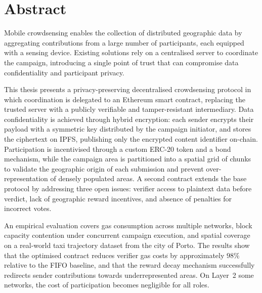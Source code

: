 \chapter*{Abstract}
Mobile crowdsensing enables the collection of distributed geographic data
by aggregating contributions from a large number of participants, each
equipped with a sensing device.
Existing solutions rely on a centralised server to coordinate the campaign,
introducing a single point of trust that can compromise data confidentiality
and participant privacy.

This thesis presents a privacy-preserving decentralised crowdsensing protocol
in which coordination is delegated to an Ethereum smart contract, replacing
the trusted server with a publicly verifiable and tamper-resistant intermediary.
Data confidentiality is achieved through hybrid encryption: each sender
encrypts their payload with a symmetric key distributed by the campaign
initiator, and stores the ciphertext on IPFS, publishing only the encrypted
content identifier on-chain.
Participation is incentivised through a custom ERC-20 token and a bond
mechanism, while the campaign area is partitioned into a spatial grid of
chunks to validate the geographic origin of each submission and prevent
over-representation of densely populated areas.
A second contract extends the base protocol by addressing three open issues:
verifier access to plaintext data before verdict, lack of geographic reward
incentives, and absence of penalties for incorrect votes.

An empirical evaluation covers gas consumption across multiple networks,
block capacity contention under concurrent campaign execution, and spatial
coverage on a real-world taxi trajectory dataset from the city of Porto.
The results show that the optimised contract reduces verifier gas costs by
approximately $98\%$ relative to the FIFO baseline, and that the reward
decay mechanism successfully redirects sender contributions towards
underrepresented areas.
On Layer~2 some networks, the cost of participation becomes negligible for all
roles.

\topmargin=-1cm
